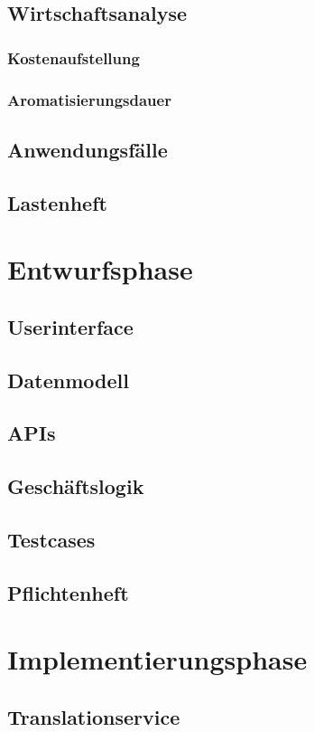 \documentclass[oneside]{article}
\begin{document}
  \subsection{Wirtschaftsanalyse}
  \subsubsection{Kostenaufstellung}
  \subsubsection{Aromatisierungsdauer}
  \subsection{Anwendungsfälle}
  \subsection{Lastenheft}
  \section{Entwurfsphase}
  \subsection{Userinterface}
  \subsection{Datenmodell}
  \subsection{APIs}
  \subsection{Geschäftslogik}
  \subsection{Testcases}
  \subsection{Pflichtenheft}
  \section{Implementierungsphase}
  \subsection{Translationservice}
\end{document}
